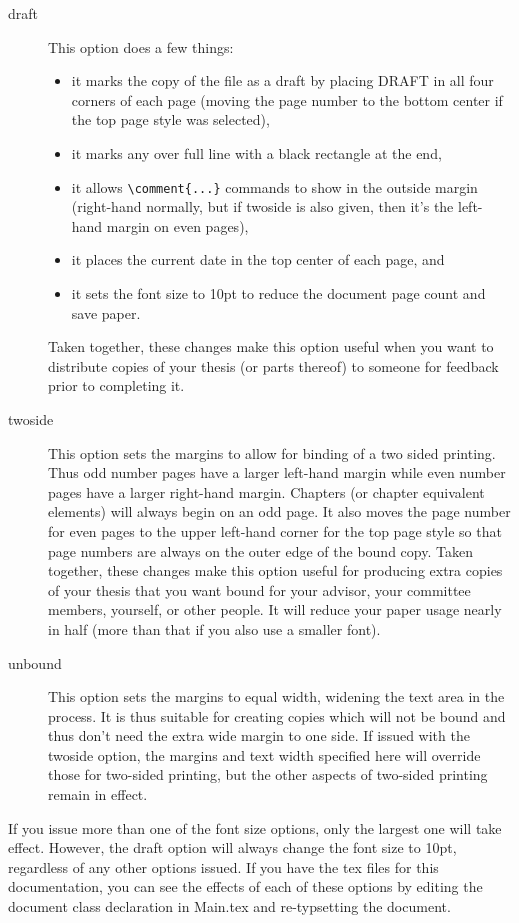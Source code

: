 \begin{description}
\item[draft]{This option does a few things:
	\begin{itemize}
	\item{it marks the copy of the file as a draft by placing DRAFT in all four corners of each page (moving the page number to the bottom center if the top page style was selected),}
	\item{it marks any over full line with a black rectangle at the end,}
	\item{it allows \verb=\comment{...}= commands to show in the outside margin (right-hand normally, but if twoside is also given, then it's the left-hand margin on even pages),}
	\item{it places the current date in the top center of each page, and}
	\item{it sets the font size to 10pt to reduce the document page count and save paper.}
	\end{itemize}
Taken together, these changes make this option useful when you want to distribute copies of your thesis (or parts thereof) to someone for feedback prior to completing it.}
\item[twoside]{This option sets the margins to allow for binding of a two sided printing.  Thus odd number pages have a larger left-hand margin while even number pages have a larger right-hand margin.  Chapters (or chapter equivalent elements) will always begin on an odd page.  It also moves the page number for even pages to the upper left-hand corner for the top page style so that page numbers are always on the outer edge of the bound copy. 
Taken together, these changes make this option useful for producing extra copies of your thesis that you want bound for your advisor, your committee members, yourself, or other people.  It will reduce your paper usage nearly in half (more than that if you also use a smaller font).}
\item[unbound]{This option sets the margins to equal width, widening the text area in the process.  It is thus suitable for creating copies which will not be bound and thus don't need the extra wide margin to one side.  If issued with the twoside option, the margins and text width specified here will override those for two-sided printing, but the other aspects of two-sided printing remain in effect.}
\end{description}
If you issue more than one of the font size options, only the largest one will take effect.  However, the draft option will always change the font size to 10pt, regardless of any other options issued.  If you have the tex files for this documentation, you can see the effects of each of these options by editing the document class declaration in Main.tex and re-typsetting the document.

